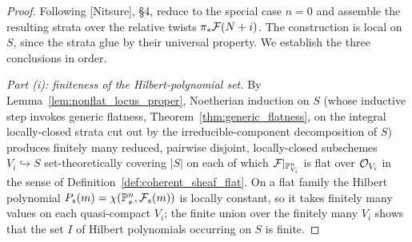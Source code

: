 \begin{proof}
  Following [Nitsure], \S4, reduce to the special case \(n = 0\) and assemble
  the resulting strata over the relative twists \(\pi_* \mathcal{F}(N+i)\).  The
  construction is local on \(S\), since the strata glue by their universal
  property.  We establish the three conclusions in order.

  \emph{Part (i): finiteness of the Hilbert-polynomial set.}
  By Lemma~\ref{lem:nonflat_locus_proper}, Noetherian induction on \(S\) (whose
  inductive step invokes generic flatness, Theorem~\ref{thm:generic_flatness},
  on the integral locally-closed strata cut out by the irreducible-component
  decomposition of \(S\)) produces finitely many reduced, pairwise disjoint,
  locally-closed subschemes \(V_i \hookrightarrow S\) set-theoretically covering
  \(|S|\) on each of which \(\mathcal{F}|_{\mathbb{P}^n_{V_i}}\) is flat over \(\mathcal{O}_{V_i}\) in
  the sense of Definition~\ref{def:coherent_sheaf_flat}.  On a flat family the
  Hilbert polynomial \(P_s(m) = \chi(\mathbb{P}^n_s, \mathcal{F}_s(m))\) is locally constant, so
  it takes finitely many values on each quasi-compact \(V_i\); the finite union
  over the finitely many \(V_i\) shows that the set \(I\) of Hilbert polynomials
  occurring on \(S\) is finite.


\end{proof}

